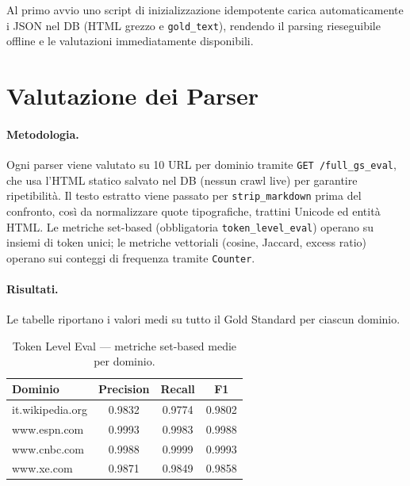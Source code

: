 \documentclass[11pt]{article}
\begin{document}
Al primo avvio uno script di inizializzazione idempotente carica automaticamente i JSON nel DB (HTML grezzo e \texttt{gold\_text}), rendendo il parsing rieseguibile offline e le valutazioni immediatamente disponibili.


\section{Valutazione dei Parser}

\paragraph{Metodologia.} Ogni parser viene valutato su 10 URL per dominio tramite \texttt{GET /full\_gs\_eval}, che usa l'HTML statico salvato nel DB (nessun crawl live) per garantire ripetibilità. Il testo estratto viene passato per \texttt{strip\_markdown} prima del confronto, così da normalizzare quote tipografiche, trattini Unicode ed entità HTML. Le metriche set-based (obbligatoria \texttt{token\_level\_eval}) operano su insiemi di token unici; le metriche vettoriali (cosine, Jaccard, excess ratio) operano sui conteggi di frequenza tramite \texttt{Counter}.

\paragraph{Risultati.} Le tabelle riportano i valori medi su tutto il Gold Standard per ciascun dominio.

\begin{table}[h]
\centering
\small
\begin{tabular}{lccc}
\toprule
\textbf{Dominio} & \textbf{Precision} & \textbf{Recall} & \textbf{F1}\\
\midrule
it.wikipedia.org  & 0.9832 & 0.9774 & 0.9802 \\
www.espn.com      & 0.9993 & 0.9983 & 0.9988 \\
www.cnbc.com      & 0.9988 & 0.9999 & 0.9993 \\
www.xe.com        & 0.9871 & 0.9849 & 0.9858 \\
\bottomrule
\end{tabular}
\caption{Token Level Eval — metriche set-based medie per dominio.}
\end{table}
\end{document}

